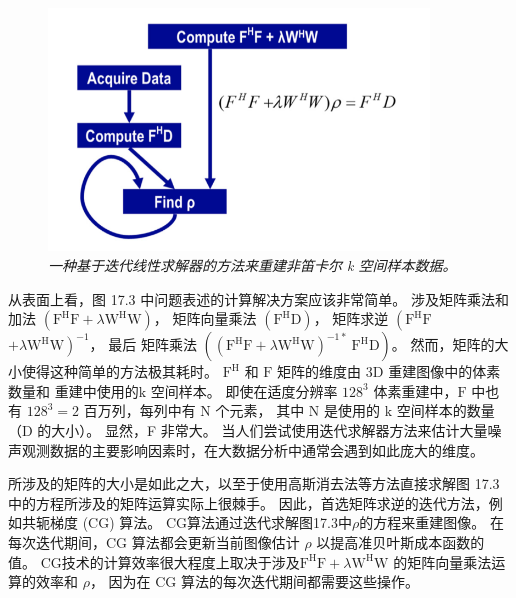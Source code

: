 \begin{figure}[H]
	\centering
	\includegraphics[width=0.9\textwidth]{figs/F17.3.png}
	\caption{\textit{一种基于迭代线性求解器的方法来重建非笛卡尔 k 空间样本数据。}}
\end{figure}

从表面上看，图 17.3 中问题表述的计算解决方案应该非常简单。 
涉及矩阵乘法和加法 $\left(\mathrm{F}^{\mathrm{H}} \mathrm{F}+\lambda \mathrm{W}^{\mathrm{H}} \mathrm{W}\right)$，
矩阵向量乘法 $\left(\mathrm{F}^{\mathrm{H}} \mathrm{D}\right)$，
矩阵求逆 $\left(\mathrm{F}^{\mathrm {H}} \mathrm{F}\right.$ $\left.+\lambda \mathrm{W}^{\mathrm{H}} \mathrm{W}\right)^{-1}$，
最后 矩阵乘法 $\left(\left(\mathrm{F}^{\mathrm{H}} \mathrm{F}+\lambda \mathrm{W}^{\mathrm{H}} \mathrm{W}\right )^{-1 *} \mathrm{~F}^{\mathrm{H}} \mathrm{D}\right)$。 
然而，矩阵的大小使得这种简单的方法极其耗时。 
$\mathrm{F}^{\mathrm{H}}$ 和 $\mathrm{F}$ 矩阵的维度由 $3 \mathrm{D}$ 重建图像中的体素数量和 重建中使用的$\mathrm{k}$ 空间样本。 
即使在适度分辨率 $128^{3}$ 体素重建中，$\mathrm{F}$ 中也有 $128^{3}=2$ 百万列，每列中有 $\mathrm{N}$ 个元素，
其中 $ \mathrm{N}$ 是使用的 $\mathrm{k}$ 空间样本的数量（D 的大小）。 显然，F 非常大。 
当人们尝试使用迭代求解器方法来估计大量噪声观测数据的主要影响因素时，在大数据分析中通常会遇到如此庞大的维度。

所涉及的矩阵的大小是如此之大，以至于使用高斯消去法等方法直接求解图 17.3 中的方程所涉及的矩阵运算实际上很棘手。 
因此，首选矩阵求逆的迭代方法，例如共轭梯度 (CG) 算法。 CG算法通过迭代求解图17.3中$\rho$的方程来重建图像。 
在每次迭代期间，CG 算法都会更新当前图像估计 $\rho$ 以提高准贝叶斯成本函数的值。 
CG技术的计算效率很大程度上取决于涉及$\mathrm{F}^{\mathrm{H}} \mathrm{F}+\lambda \mathrm{W}^{\mathrm{H}} \mathrm{W}$ 的矩阵向量乘法运算的效率和 $\rho$，
因为在 $\mathrm{CG}$ 算法的每次迭代期间都需要这些操作。

